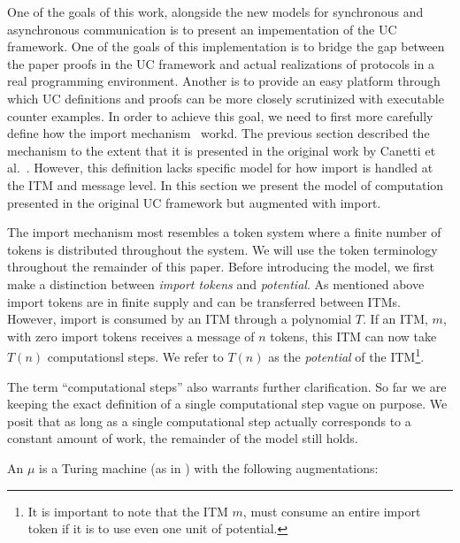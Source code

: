 One of the goals of this work, alongside the new models for synchronous and asynchronous communication is to present an impementation of the UC framework.
One of the goals of this implementation is to bridge the gap between the paper proofs in the UC framework and actual realizations of protocols in a real programming environment.
Another is to provide an easy platform through which UC definitions and proofs can be more closely scrutinized with executable counter examples.
In order to achieve this goal, we need to first more carefully define how the import mechanism~\cite{uc} workd.
The previous section described the mechanism to the extent that it is presented in the original work by Canetti et al.~\cite{uc}.
However, this definition lacks specific model for how import is handled at the ITM and message level.
In this section we present the model of computation presented in the original UC framework but augmented with import.

The import mechanism most resembles a token system where a finite number of tokens is distributed throughout the system.
We will use the token terminology throughout the remainder of this paper.
Before introducing the model, we first make a distinction between {\em import tokens} and {\em potential}.
As mentioned above import tokens are in finite supply and can be transferred between ITMs.
However, import is consumed by an ITM through a polynomial $T$.
If an ITM, $m$, with zero import tokens receives a message of $n$ tokens, this ITM can now take $T(n)$ computationsl steps.
We refer to $T(n)$ as the {\em potential} of the ITM\footnote{It is important to note that the ITM $m$, must consume an entire import token if it is to use even one unit of potential.}.

The term ``computational steps'' also warrants further clarification.
So far we are keeping the exact definition of a single computational step vague on purpose.
We posit that as long as a single computational step actually corresponds to a constant amount of work, the remainder of the model still holds. 

\begin{ddef}
An  $\mu$ is a Turing machine (as in \cite{uc}) with the following augmentations:
\end{ddef}


